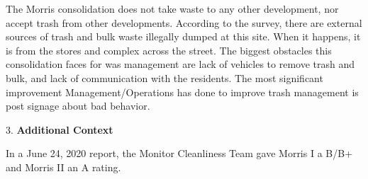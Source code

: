 The Morris consolidation does not take waste to any other development, nor accept trash from other developments. According to the survey, there are external sources of trash and bulk waste illegally dumped at this site. When it happens, it is from the stores and complex across the street.  The biggest obstacles this consolidation faces for was management are lack of vehicles to remove trash and bulk, and lack of communication with the residents. The most significant improvement Management/Operations has done to improve trash management is post signage about bad behavior. 

3. \textbf{Additional Context}

In a June 24, 2020 report, the Monitor Cleanliness Team gave Morris I a B/B+ and Morris II an A rating. 